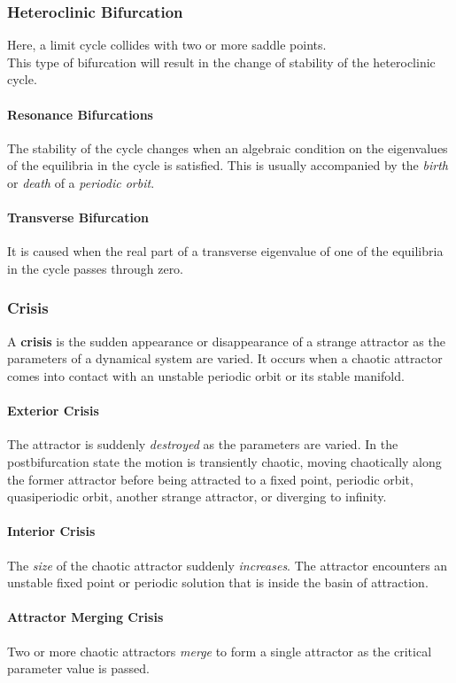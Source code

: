\subsubsection{Heteroclinic Bifurcation}
Here, a limit cycle collides with two or more saddle points.\\
This type of bifurcation will result in the change of stability of the heteroclinic cycle.
\paragraph{Resonance Bifurcations}
The stability of the cycle changes when an algebraic condition on the eigenvalues of the equilibria in the cycle is satisfied.
This is usually accompanied by the \emph{birth} or \emph{death} of a \emph{periodic orbit}.
\paragraph{Transverse Bifurcation}
It is caused when the real part of a transverse eigenvalue of one of the equilibria in the cycle passes through zero.
\subsubsection{Crisis}
A \textbf{crisis} is the sudden appearance or disappearance of a strange attractor as the parameters of a dynamical system are varied.
It occurs when a chaotic attractor comes into contact with an unstable periodic orbit or its stable manifold.
\paragraph{Exterior Crisis}
The attractor is suddenly \emph{destroyed} as the parameters are varied.
In the postbifurcation state the motion is transiently chaotic, moving chaotically along the former attractor before being attracted to a fixed point, periodic orbit, quasiperiodic orbit, another strange attractor, or diverging to infinity.
\paragraph{Interior Crisis}
The \emph{size} of the chaotic attractor suddenly \emph{increases}.
The attractor encounters an unstable fixed point or periodic solution that is inside the basin of attraction.
\paragraph{Attractor Merging Crisis}
Two or more chaotic attractors \emph{merge} to form a single attractor as the critical parameter value is passed.
